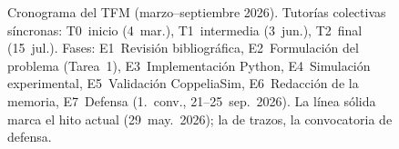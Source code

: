 \begin{figure}[htbp]
\begin{tikzpicture}[x=1.55cm, y=0.72cm]
\end{tikzpicture}
\caption[Cronograma del TFM]%
{Cronograma del TFM (marzo--septiembre 2026).
Tutorías colectivas síncronas: T0~inicio (4~mar.), T1~intermedia (3~jun.),
T2~final (15~jul.).
Fases: E1~Revisión bibliográfica, E2~Formulación del problema (Tarea~1),
E3~Implementación Python, E4~Simulación experimental,
E5~Validación CoppeliaSim, E6~Redacción de la memoria,
E7~Defensa (1.\textordfeminine\ conv., 21--25~sep.\ 2026).
La línea sólida marca el hito actual (29~may.\ 2026); la de trazos,
la convocatoria de defensa.}
\label{fig:gantt}
\end{figure}
